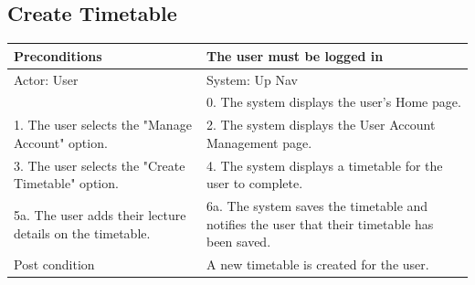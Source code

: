 \documentclass{article}
\begin{document}
\begin{enumerate}
	\subsection{Create Timetable}
	\begin{tabular}{ | m{15em} | m{15em}| }
		\hline
		Preconditions                                                       				& The user must be logged in \\ 				
		\hline
		Actor: User                                                       					& System: Up Nav \\ 			
		\hline
                                                                  							& 0. The system displays the user's Home page. \\                                                           
		 \hline
		1. The user selects the "Manage Account" option.				& 2. The system displays the User Account Management page. \\
		 \hline
		3. The user selects the "Create Timetable" option. 				& 4.  The system displays a timetable for the user to complete. \\
		\hline
		5a. The user adds their lecture details on the timetable. 			& 6a. The system saves the timetable and notifies the user that their timetable has been saved. \\ 
		\hline
		Post condition                                                     				& A new timetable is created for the user. \\ 			
		\hline
	\end{tabular}


\end{enumerate}
\end{document}
